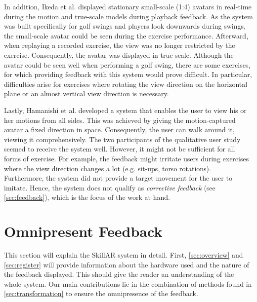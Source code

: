In addition, Ikeda et al. \cite{ikeda2018arb} displayed stationary small-scale (1:4) avatars in real-time during the motion and true-scale models during playback feedback. As the system was built specifically for golf swings and players look downwards during swings, the small-scale avatar could be seen during the exercise performance. Afterward, when replaying a recorded exercise, the view was no longer restricted by the exercise. Consequently, the avatar was displayed in true-scale. Although the avatar could be seen well when performing a golf swing, there are some exercises, for which providing feedback with this system would prove difficult. In particular, difficulties arise for exercises where rotating the view direction on the horizontal plane or an almost vertical view direction is necessary.

Lastly, Hamanishi et al. \cite{Hamanishi2019avu} developed a system that enables the user to view his or her motions from all sides. This was achieved by giving the motion-captured avatar a fixed direction in space. Consequently, the user can walk around it, viewing it comprehensively. The two participants of the qualitative user study seemed to receive the system well. However, it might not be sufficient for all forms of exercise. For example, the feedback might irritate users during exercises where the view direction changes a lot (e.g. sit-ups, torso rotations). Furthermore, the system did not provide a target movement for the user to imitate. Hence, the system does not qualify as \emph{corrective feedback} (see \autoref{sec:feedback}), which is the focus of the work at hand.

\section{Omnipresent Feedback}
This section will explain the SkillAR system in detail. First, \autoref{sec:overview} and \autoref{sec:register} will provide information about the hardware used and the nature of the feedback displayed. This should give the reader an understanding of the whole system. Our main contributions lie in the combination of methods found in \autoref{sec:transformation} to ensure the omnipresence of the feedback.

